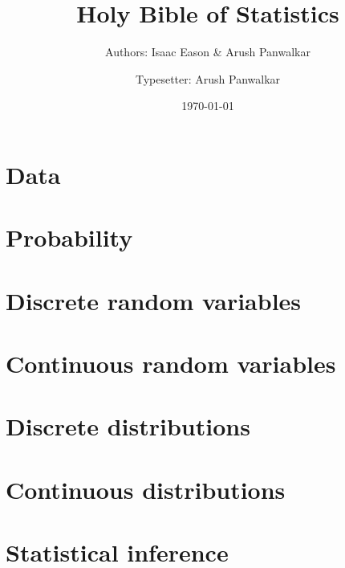 \documentclass[11pt]{book}
\title{Holy Bible of Statistics}
\author{
  Authors: Isaac Eason \& Arush Panwalkar\\
  \and
  Typesetter: Arush Panwalkar\\
}
\date{\today}
\begin{document}
\maketitle
\newtheorem{theorem}{Theorem}[section]
\newtheorem{lemma}{Lemma}[theorem]
\newtheorem{corollary}{Corollary}[theorem]
\theoremstyle{definition}
\newtheorem{definition}{Definition}
\theoremstyle{definition}
\newtheorem*{example}{Example}
\newtheorem*{proposition}{Proposition}
\theoremstyle{remark}
\newtheorem*{claim}{Claim}
\theoremstyle{remark}
\newtheorem*{remark}{Remark}
\tableofcontents

\chapter{Data}

\chapter{Probability}

\chapter{Discrete random variables}

\chapter{Continuous random variables}

\chapter{Discrete distributions}

\chapter{Continuous distributions}

\chapter{Statistical inference}
\end{document}
